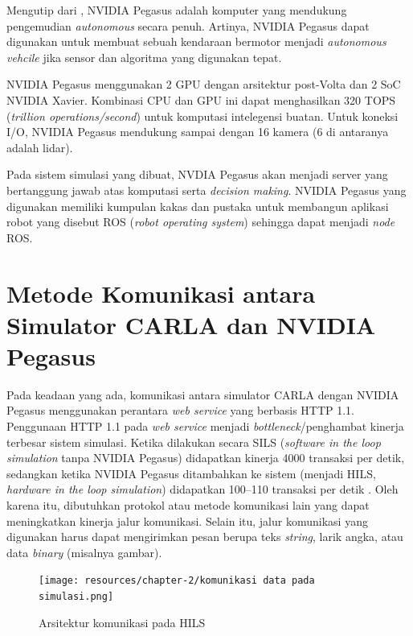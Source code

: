 Mengutip dari \parencite{oh_2017}, NVIDIA Pegasus adalah komputer yang mendukung
pengemudian \textit{autonomous} secara penuh. Artinya, NVIDIA Pegasus dapat
digunakan untuk membuat sebuah kendaraan bermotor menjadi \textit{autonomous
    vehcile} jika sensor dan algoritma yang digunakan tepat.

NVIDIA Pegasus menggunakan 2 GPU dengan arsitektur post-Volta dan 2 SoC NVIDIA
Xavier. Kombinasi CPU dan GPU ini dapat menghasilkan 320 TOPS (\textit{trillion
    operations/second}) untuk komputasi intelegensi buatan. Untuk koneksi I/O,
NVIDIA Pegasus mendukung sampai dengan 16 kamera (6 di antaranya adalah lidar).

Pada sistem simulasi yang dibuat, NVDIA Pegasus akan menjadi server yang
ber\-tang\-gung jawab atas komputasi serta \textit{decision making}. NVIDIA
Pegasus yang digunakan memiliki kumpulan kakas dan pustaka untuk membangun
aplikasi robot yang disebut ROS (\textit{robot operating system}) sehingga dapat
menjadi \textit{node} ROS.

\section{Metode Komunikasi antara Simulator CARLA dan NVI\-DI\-A Pegasus}

Pada keadaan yang ada, komunikasi antara simulator CARLA dengan NVIDIA Pegasus
menggunakan perantara \textit{web service} yang berbasis HTTP 1.1. Penggunaan
HTTP 1.1 pada \textit{web service} menjadi \textit{bottleneck}/penghambat
kinerja terbesar sistem simulasi. Ketika dilakukan secara SILS (\textit{software
    in the loop simulation} tanpa NVIDIA Pegasus) didapatkan kinerja 4000 transaksi
per detik, sedangkan ketika NVIDIA Pegasus ditambahkan ke sistem (menjadi HILS,
\textit{hardware in the loop simulation}) didapatkan 100--110 transaksi per
detik \parencite{trilaksono_laporanRispro}. Oleh karena itu, dibutuhkan protokol
atau metode komunikasi lain yang dapat meningkatkan kinerja jalur komunikasi.
Selain itu, jalur komunikasi yang digunakan harus dapat mengirimkan pesan berupa
teks \textit{string}, larik angka, atau data \textit{binary} (misalnya gambar).

\begin{figure}
    \begin{center}
        \texttt{[image: resources/chapter-2/komunikasi
            data pada simulasi.png]}
        \caption{Arsitektur komunikasi pada HILS
            \parencite{trilaksono_laporanRispro}}
    \end{center}
\end{figure}

